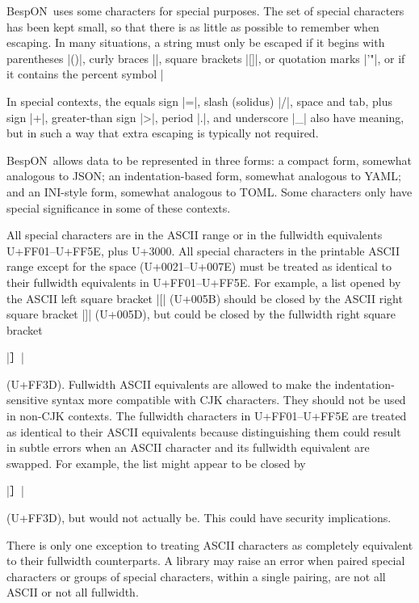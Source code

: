 \documentclass[11pt]{article}
\newcommand{\bespon}{BespON}
\begin{document}
\bespon\ uses some characters for special purposes.  The set of special characters has been kept small, so that there is as little as possible to remember when escaping.  In many situations, a string must only be escaped if it begins with parentheses |()|, curly braces |{}|, square brackets |[]|, or quotation marks |'"|, or if it contains the percent symbol |%

In special contexts, the equals sign |=|, slash (solidus) |/|, space and tab, plus sign |+|, greater-than sign |>|, period |.|, and underscore |_| also have meaning, but in such a way that extra escaping is typically not required.

\bespon\ allows data to be represented in three forms:  a compact form, somewhat analogous to JSON; an indentation-based form, somewhat analogous to YAML; and an INI-style form, somewhat analogous to TOML.  Some characters only have special significance in some of these contexts.

All special characters are in the ASCII range or in the fullwidth equivalents  U+FF01--U+FF5E, plus U+3000.  All special characters in the printable ASCII range except for the space (U+0021--U+007E) must be treated as identical to their fullwidth equivalents in U+FF01--U+FF5E.  For example, a list opened by the ASCII left square bracket |[| (U+005B) should be closed by the ASCII right square bracket |]| (U+005D), but could be closed by the fullwidth right square bracket \begin{CJK*}{UTF8}{gkai}|］|\end{CJK*} (U+FF3D).  Fullwidth ASCII equivalents are allowed to make the indentation-sensitive syntax more compatible with CJK characters.  They should not be used in non-CJK contexts.  The fullwidth characters in U+FF01--U+FF5E are treated as identical to their ASCII equivalents because distinguishing them could result in subtle errors when an ASCII character and its fullwidth equivalent are swapped.  For example, the list might appear to be closed by \begin{CJK*}{UTF8}{gkai}|］|\end{CJK*} (U+FF3D), but would not actually be.  This could have security implications.

There is only one exception to treating ASCII characters as completely equivalent to their fullwidth counterparts.  A library may raise an error when paired special characters or groups of special characters, within a single pairing, are not all ASCII or not all fullwidth.
\end{document}
